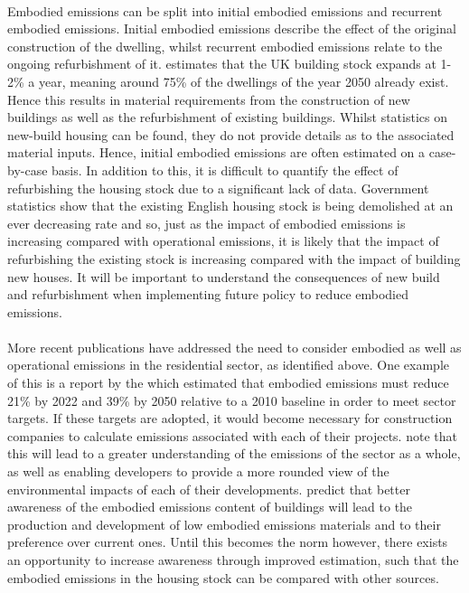 \documentclass[12pt]{article}
\begin{document}
\paragraph{}
Embodied emissions can be split into initial embodied emissions and recurrent embodied emissions. Initial embodied emissions describe the effect of the original construction of the dwelling, whilst recurrent embodied emissions relate to the ongoing refurbishment of it. \citet{Ravetz2008-oe} estimates that the UK building stock expands at 1-2\% a year, meaning around 75\% of the dwellings of the year 2050 already exist. Hence this results in material requirements from the construction of new buildings as well as the refurbishment of existing buildings. Whilst statistics on new-build housing can be found, they do not provide details as to the associated material inputs. Hence, initial embodied emissions are often estimated on a case-by-case basis. In addition to this, it is difficult to quantify the effect of refurbishing the housing stock due to a significant lack of data. Government statistics show that the existing English housing stock is being demolished at an ever decreasing rate \citep{Ministry_of_Housing_Communities2012-rt} and so, just as the impact of embodied emissions is increasing compared with operational emissions, it is likely that the impact of refurbishing the existing stock is increasing compared with the impact of building new houses. It will be important to understand the consequences of new build and refurbishment when implementing future policy to reduce embodied emissions.

\paragraph{}
More recent publications have addressed the need to consider embodied as well as operational emissions in the residential sector, as identified above. One example of this is a report by the \citet{The_Green_Construction_Board2013-vo} which estimated that embodied emissions must reduce 21\% by 2022 and 39\% by 2050 relative to a 2010 baseline in order to meet sector targets. If these targets are adopted, it would become necessary for construction companies to calculate emissions associated with each of their projects. \citet{Rawlinson_undated-rw} note that this will lead to a greater understanding of the emissions of the sector as a whole, as well as enabling developers to provide a more rounded view of the environmental impacts of each of their developments. \citet{Ibn-Mohammed2013-wu} predict that better awareness of the embodied emissions content of buildings will lead to the production and development of low embodied emissions materials and to their preference over current ones. Until this becomes the norm however, there exists an opportunity to increase awareness through improved estimation, such that the embodied emissions in the housing stock can be compared with other sources.
\end{document}
